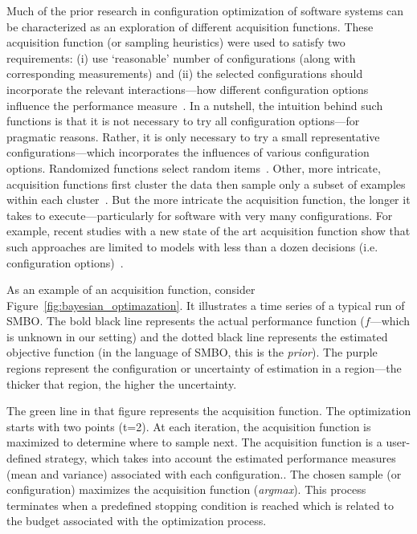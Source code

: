 Much of the prior  research in configuration optimization of software systems can
be characterized as an exploration of 
different acquisition functions.
These acquisition function (or sampling heuristics) were used to satisfy two requirements: (i) use `reasonable' number of configurations (along with corresponding measurements) and (ii) the selected configurations should incorporate the relevant interactions---how different configuration options influence the performance measure~\cite{SGA+15}.
In a nutshell, the intuition behind such functions is that it is not necessary to try all configuration options---for pragmatic reasons. Rather, it is only necessary to try a small representative configurations---which incorporates the influences of various configuration options.
Randomized  functions
 select random items~\cite{guo2013variability, sarkar2015cost}. Other, more intricate,
acquisition functions first cluster the data then sample only
a subset of examples within each cluster~\cite{nair17}.
But the more intricate the acquisition function, the longer it
takes to execute---particularly for software with very many configurations.  For example,
recent studies with   a new state of the art acquisition function show that such approaches are limited to models with less than a dozen decisions (i.e. configuration options)~\cite{zuluaga2016varepsilon}.




As an example of an acquisition function, consider
Figure~\ref{fig:bayesian_optimazation}. It illustrates a time series of a typical
 run of SMBO. The bold black line represents the actual performance function ($f$---which is unknown in our setting) and the dotted black line represents the estimated objective function (in the language of SMBO, this is the {\em prior}). 
 The purple regions represent the configuration or uncertainty of estimation in a region---the thicker that region, the higher the uncertainty.
 
 The green line in that figure represents the acquisition function. The optimization starts with two points (t=2). At each iteration, the acquisition function is maximized to determine where to sample next. The acquisition function is a user-defined strategy, which takes into account the estimated performance measures (mean and variance) associated with each configuration.. The chosen sample (or configuration) maximizes the acquisition function (\textit{argmax}). This process terminates when a predefined stopping condition is reached which is related to the budget associated with the optimization process.


